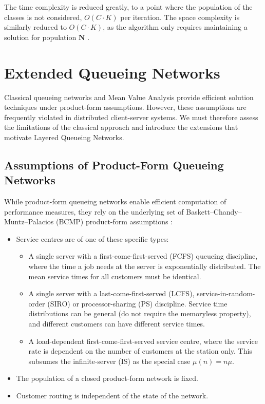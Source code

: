 The time complexity is reduced greatly, to a point where the population of the classes is not considered, $O(C \cdot K)$ per iteration. The space complexity is similarly reduced to $O(C \cdot K)$, as the algorithm only requires maintaining a solution for population $\mathbf{N}$ \cite{lazowska84,bard79}.



\section{Extended Queueing Networks}
\label{sec:bg-extended}

Classical queueing networks and Mean Value Analysis provide efficient solution techniques under product-form assumptions. However, these assumptions are frequently violated in distributed client-server systems. We must therefore assess the limitations of the classical approach and introduce the extensions that motivate Layered Queueing Networks.

\subsection{Assumptions of Product-Form Queueing Networks}
\label{sec:bg-pf-assumptions}

While product-form queueing networks enable efficient computation of performance measures, they rely on the underlying set of Baskett–Chandy–Muntz–Palacios (BCMP) product-form assumptions \cite{franks99, baskett75}:

\begin{itemize}
\item Service centres are of one of these specific types:
\begin{itemize}
\item A single server with a first-come-first-served (FCFS) queueing discipline, where the time a job needs at the server is exponentially distributed. The mean service times for all customers must be identical.
\item A single server with a last-come-first-served (LCFS), service-in-random-order (SIRO) or processor-sharing (PS) discipline. Service time distributions can be general (do not require the memoryless property), and different customers can have different service times.
\item A load-dependent first-come-first-served service centre, where the service rate is dependent on the number of customers at the station only. This subsumes the infinite-server (IS) as the special case $\mu(n) = n\mu$.
\end{itemize}
\item The population of a closed product-form network is fixed.
\item Customer routing is independent of the state of the network.
\end{itemize}

